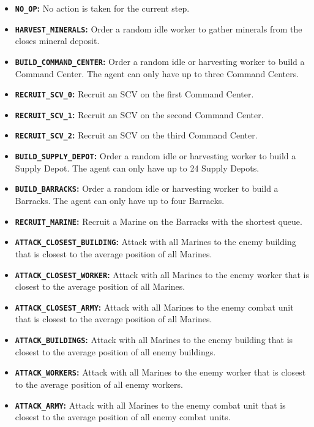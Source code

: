 \begin{itemize}
    \item \textbf{\texttt{NO\_OP}:} No action is taken for the current step.
    \item \textbf{\texttt{HARVEST\_MINERALS}:} Order a random idle worker to gather minerals from the closes mineral deposit.
    \item \textbf{\texttt{BUILD\_COMMAND\_CENTER}:} Order a random idle or harvesting worker to build a Command Center. The agent can only have up to three Command Centers.
    \item \textbf{\texttt{RECRUIT\_SCV\_0}:} Recruit an SCV on the first Command Center.
    \item \textbf{\texttt{RECRUIT\_SCV\_1}:} Recruit an SCV on the second Command Center.
    \item \textbf{\texttt{RECRUIT\_SCV\_2}:} Recruit an SCV on the third Command Center.
    \item \textbf{\texttt{BUILD\_SUPPLY\_DEPOT}:} Order a random idle or harvesting worker to build a Supply Depot. The agent can only have up to 24 Supply Depots.
    \item \textbf{\texttt{BUILD\_BARRACKS}:} Order a random idle or harvesting worker to build a Barracks. The agent can only have up to four Barracks.
    \item \textbf{\texttt{RECRUIT\_MARINE}:} Recruit a Marine on the Barracks with the shortest queue.
    \item \textbf{\texttt{ATTACK\_CLOSEST\_BUILDING}:} Attack with all Marines to the enemy building that is closest to the average position of all Marines.
    \item \textbf{\texttt{ATTACK\_CLOSEST\_WORKER}:} Attack with all Marines to the enemy worker that is closest to the average position of all Marines.
    \item \textbf{\texttt{ATTACK\_CLOSEST\_ARMY}:} Attack with all Marines to the enemy combat unit that is closest to the average position of all Marines.
    \item \textbf{\texttt{ATTACK\_BUILDINGS}:} Attack with all Marines to the enemy building that is closest to the average position of all enemy buildings.
    \item \textbf{\texttt{ATTACK\_WORKERS}:} Attack with all Marines to the enemy worker that is closest to the average position of all enemy workers.
    \item \textbf{\texttt{ATTACK\_ARMY}:} Attack with all Marines to the enemy combat unit that is closest to the average position of all enemy combat units.
\end{itemize}

